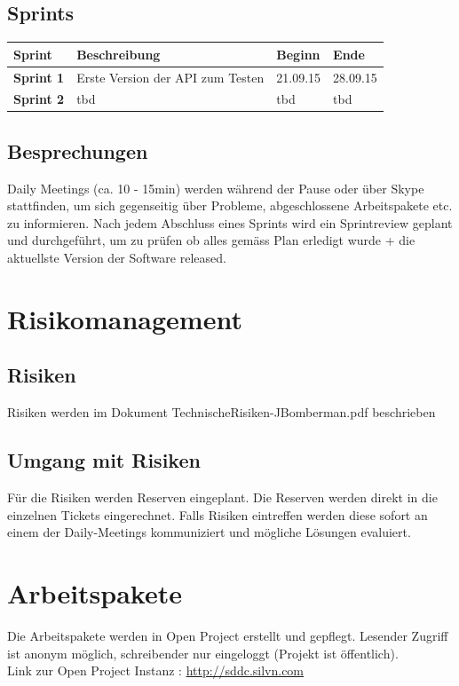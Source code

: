 \documentclass[11pt]{scrartcl}
\begin{document}
\subsection{Sprints}
\begin{tabularx}{\textwidth}{l X l l}
\textbf{Sprint} & \textbf{Beschreibung} & \textbf{Beginn} &  \textbf{Ende} \\
\hline
\textbf{Sprint 1} & Erste Version der API zum Testen  & 21.09.15 & 28.09.15 \\
\hline
\textbf{Sprint 2} & tbd  & tbd & tbd \\
\hline
\end{tabularx}

\subsection{Besprechungen}
Daily Meetings (ca. 10 - 15min) werden während der Pause oder über Skype stattfinden, um sich 
gegenseitig über Probleme, abgeschlossene Arbeitspakete etc. zu informieren.
Nach jedem Abschluss eines Sprints wird ein Sprintreview geplant und durchgeführt, um zu prüfen 
ob alles gemäss Plan erledigt wurde + die aktuellste Version der Software 
released.
\section{Risikomanagement}
\subsection{Risiken}
Risiken werden im Dokument TechnischeRisiken-JBomberman.pdf beschrieben
\subsection{Umgang mit Risiken}
Für die Risiken werden Reserven eingeplant. Die Reserven werden direkt in die einzelnen Tickets 
eingerechnet. Falls Risiken eintreffen werden diese sofort an einem der Daily-Meetings kommuniziert 
und mögliche Lösungen evaluiert.
\section{Arbeitspakete}

Die Arbeitspakete werden in Open Project erstellt und gepflegt.
Lesender Zugriff ist anonym möglich, schreibender nur eingeloggt (Projekt ist öffentlich). 
\\
Link zur Open Project Instanz : \href{http://sddc.silvn.com}{http://sddc.silvn.com}
\end{document}

